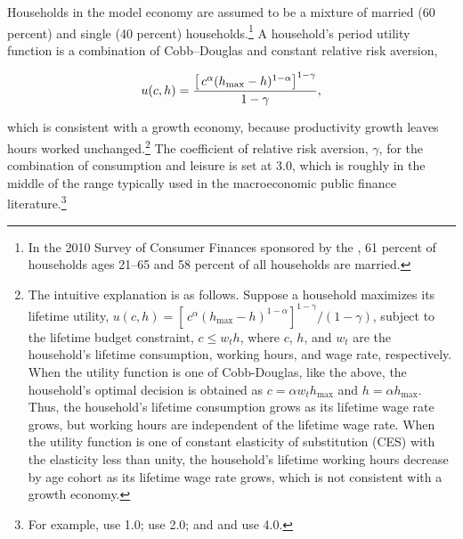 \documentclass[11pt,leqno,fleqn]{article}
\newcommand{\be}{\vspace{-1em}\begin{singlespace}\begin{equation}}
\newcommand{\ee}{\end{equation}\end{singlespace}}
\begin{document}
Households in the model economy are assumed to be a mixture of married (60 percent) and single (40 percent) households.\footnote{In the 2010 Survey of Consumer Finances sponsored by the \citet{FRS:2012}, 61 percent of households ages 21--65 and 58 percent of all households are married.} A household's period utility function is a combination of Cobb--Douglas and constant relative risk aversion,

\be u(c,h)=\frac{\left[\,c^{\alpha}(h_{\max}-h)^{1-\alpha}\right]^{1-\gamma}}{1-\gamma}, \notag \ee

which is consistent with a growth economy, because productivity growth leaves hours worked unchanged.\footnote{The intuitive explanation is as follows. Suppose a household maximizes its lifetime utility, $u(c,h)=[\,c^{\alpha}(h_{\max}-h)^{1-\alpha}]^{1-\gamma}/(1-\gamma)$, subject to the lifetime budget constraint, $c\leq w_{t}h$, where $c$, $h$, and $w_{t}$ are the household's lifetime consumption, working hours, and wage rate, respectively. When the utility function is one of Cobb-Douglas, like the above, the household's optimal decision is obtained as $c=\alpha w_{t}h_{\max}$ and $h=\alpha h_{\max}$. Thus, the household's lifetime consumption grows as its lifetime wage rate grows, but working hours are independent of the lifetime wage rate. When the utility function is one of constant elasticity of substitution (CES) with the elasticity less than unity, the household's lifetime working hours decrease by age cohort as its lifetime wage rate grows, which is not consistent with a growth economy.} The coefficient of relative risk aversion, $\gamma$, for the combination of consumption and leisure is set at 3.0, which is roughly in the middle of the range typically used in the macroeconomic public finance literature.\footnote{For example, \citet{Domeij.Heathcote:2004} use 1.0; \citet{Imrohorouglu.etal:1995} use 2.0; and \citet{Auerbach.Kotlikoff:1987} and \citet{Conesa.etal:2009} use 4.0.} 
\end{document}

